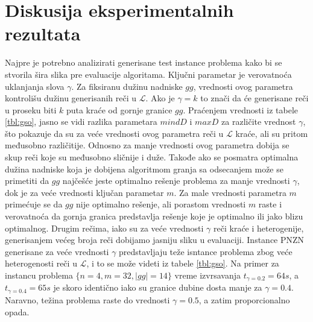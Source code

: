 \documentclass[12pt,oneside]{memoir}
\begin{document}
\section{Diskusija eksperimentalnih rezultata}
\label{chap:diskusijaRez}
Najpre je potrebno
analizirati generisane test instance problema kako bi se stvorila šira slika
pre evaluacije algoritama. Ključni parametar
je verovatnoća uklanjanja slova $\gamma$. 
Za fiksiranu dužinu nadniske $gg$, vrednosti ovog parametra
kontrolišu dužinu generisanih reči u $\mathcal{L}$.
Ako je $\gamma=k$ to znači da će generisane reči u proseku
biti $k$ puta kraće od gornje granice $gg$.
Praćenjem vrednosti iz tabele \ref{tbl:gso}, jasno se vidi
razlika parametara $mindD$ i $maxD$ za različite vrednost $\gamma$,
što pokazuje da su za veće vrednosti ovog parametra reči u $\mathcal{L}$ kraće,
ali su pritom međusobno različitije. Odnosno za manje vrednosti
ovog parametra dobija se skup reči koje su međusobno sličnije i duže.
Takođe ako se posmatra optimalna dužina nadniske koja je dobijena algoritmom
granja sa odsecanjem
može se primetiti da $gg$ najčešće jeste 
optimalno rešenje problema za manje vrednosti $\gamma$, dok je za veće 
vrednosti ključan parametar $m$. Za male vrednosti parametra
$m$ primećuje se da $gg$ nije optimalno rešenje,
ali porastom vrednosti $m$ raste i verovatnoća da gornja granica predstavlja
rešenje koje je optimalno ili jako blizu optimalnog.
Drugim rečima, iako su za veće vrednosti $\gamma$ reči kraće i heterogenije,
generisanjem većeg broja reči dobijamo jasniju sliku u evaluaciji.
Instance PNZN generisane za veće vrednosti $\gamma$ predstavljaju
teže isntance problema zbog veće heterogenosti reči u $\mathcal{L}$, i to
se može videti iz tabele \ref{tbl:gso}. Na primer za instancu problema
$\{n=4,m=32,|gg|=14\}$ vreme izvrsavanja $t_{\gamma=0.2}=64s$, a $t_{\gamma=0.4}=65s$
je skoro identično iako su granice dubine dosta manje za $\gamma=0.4$.
Naravno, težina problema raste do vrednosti $\gamma=0.5$, a zatim proporcionalno opada.
\end{document}
